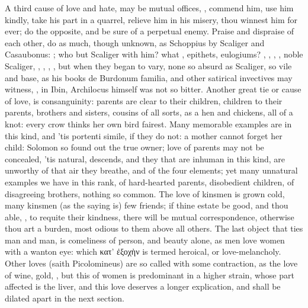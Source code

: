 {A third cause of love and hate, may be mutual offices, , commend him, use him kindly, take his part in a
quarrel, relieve him in his misery, thou winnest him for ever; do the
opposite, and be sure of a perpetual enemy. Praise and dispraise of
each other, do as much, though unknown, as Schoppius by Scaliger
and Casaubonus: ; who but Scaliger with him? what
, epithets, eulogiums? , , , , noble Scaliger,
 , \etc{}, , \etc{}, but when they began to
vary, none so absurd as Scaliger, so vile and base, as his books de
Burdonum familia, and other satirical invectives may witness, \Ovid, in
Ibin, Archilocus himself was not so bitter. Another great tie or cause
of love, is consanguinity: parents are clear to their children,
children to their parents, brothers and sisters, cousins of all sorts,
as a hen and chickens, all of a knot: every crow thinks her own bird
fairest. Many memorable examples are in this kind, and 'tis portenti
simile, if they do not: a mother cannot forget her child: Solomon
so found out the true owner; love of parents may not be concealed, 'tis
natural, descends, and they that are inhuman in this kind, are unworthy
of that air they breathe, and of the four elements; yet many unnatural
examples we have in this rank, of hard-hearted parents, disobedient
children, of disagreeing brothers, nothing so common. The love of
kinsmen is grown cold, many kinsmen (as the saying is) few
friends; if thine estate be good, and thou able, , to
requite their kindness, there will be mutual correspondence, otherwise
thou art a burden, most odious to them above all others. The last
object that ties man and man, is comeliness of person, and beauty
alone, as men love women with a wanton eye: which \textgreek{κατ' ἐξοχὴν} is termed
heroical, or love-melancholy. Other loves (saith Picolomineus) are so
called with some contraction, as the love of wine, gold, \etc{}, but this
of women is predominant in a higher strain, whose part affected is the
liver, and this love deserves a longer explication, and shall be
dilated apart in the next section.

}
